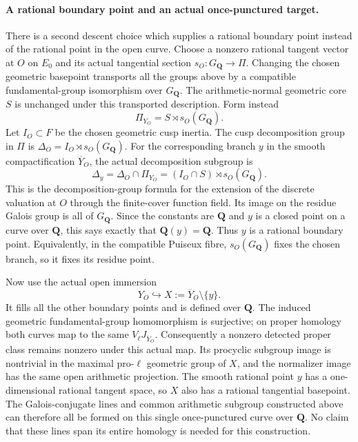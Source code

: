 \paragraph{A rational boundary point and an actual once-punctured target.}
There is a second descent choice which supplies a rational
boundary point instead of the rational point in the open
curve. Choose a nonzero rational tangent vector at $O$ on
$E_0$ and its actual tangential section
$s_O:G_{\mathbf Q}\to\Pi$. Changing the chosen geometric
basepoint transports all the groups above by a compatible
fundamental-group isomorphism over $G_{\mathbf Q}$.
The arithmetic-normal geometric core $S$ is unchanged
under this transported description. Form instead
\[
          \Pi_{Y_O}=S\rtimes s_O(G_{\mathbf Q}).
\]
Let $I_O\subset F$ be the chosen geometric cusp inertia.
The cusp decomposition group in $\Pi$ is
$\Delta_O=I_O\rtimes s_O(G_{\mathbf Q})$. For the
corresponding branch $y$ in the smooth compactification
$\overline Y_O$, the actual decomposition subgroup is
\[
 \Delta_y=\Delta_O\cap\Pi_{Y_O}
          =(I_O\cap S)\rtimes s_O(G_{\mathbf Q}).
\]
This is the decomposition-group formula for the extension
of the discrete valuation at $O$ through the finite-cover
function field. Its image on the residue Galois group is
all of $G_{\mathbf Q}$. Since the constants are $\mathbf Q$
and $y$ is a closed point on a curve over $\mathbf Q$,
this says exactly that $\mathbf Q(y)=\mathbf Q$.
Thus $y$ is a rational boundary point. Equivalently, in
the compatible Puiseux fibre, $s_O(G_{\mathbf Q})$ fixes
the chosen branch, so it fixes its residue point.

Now use the actual open immersion
\[
             Y_O\hookrightarrow
             X:=\overline Y_O\setminus\{y\}.
\]
It fills all the other boundary points and is defined
over $\mathbf Q$. The induced geometric fundamental-group
homomorphism is surjective; on proper homology both
curves map to the same $V_\ell J_{\overline Y_O}$.
Consequently a nonzero detected proper class remains
nonzero under this actual map. Its procyclic subgroup
image is nontrivial in the maximal pro-$\ell$ geometric
group of $X$, and the normalizer image has the same
open arithmetic projection. The smooth rational point
$y$ has a one-dimensional rational tangent space, so
$X$ also has a rational tangential basepoint. The
Galois-conjugate lines and common arithmetic subgroup
constructed above can therefore all be formed on this
single once-punctured curve over $\mathbf Q$.
No claim that these lines span its entire homology is
needed for this construction.

